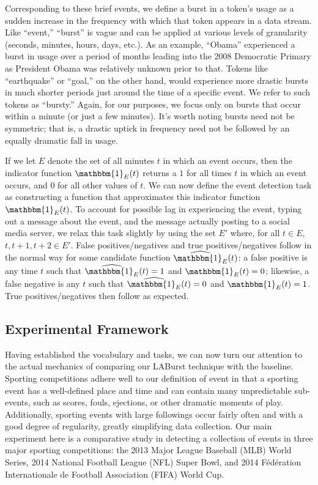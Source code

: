 \documentclass{sig-alternate}
\begin{document}
Corresponding to these brief events, we define a burst in a token's usage as a sudden increase in the frequency with which that token appears in a data stream.
Like ``event,'' ``burst'' is vague and can be applied at various levels of granularity (seconds, minutes, hours, days, etc.).
As an example, ``Obama'' experienced a burst in usage over a period of months leading into the 2008 Democratic Primary as President Obama was relatively unknown prior to that. 
Tokens like ``earthquake'' or ``goal,'' on the other hand, would experience more drastic bursts in much shorter periods just around the time of a specific event.
We refer to such tokens as ``bursty.''
Again, for our purposes, we focus only on bursts that occur within a minute (or just a few minutes). 
It's worth noting bursts need not be symmetric; that is, a drastic uptick in frequency need not be followed by an equally dramatic fall in usage.

If we let $E$ denote the set of all minutes $t$ in which an event occurs, then the indicator function $\mathbbm{1}_E(t)$ returns a $1$ for all times $t$ in which an event occurs, and $0$ for all other values of $t$. 
We can now define the event detection task as constructing a function that approximates this indicator function $\mathbbm{1}_E(t)$.
To account for possible lag in experiencing the event, typing out a message about the event, and the message actually posting to a social media server, we relax this task slightly by using the set $E'$ where, for all $t \in E$, $t, t+1, t+2 \in E'$.
False positives/negatives and true positives/negatives follow in the normal way for some candidate function $\widehat{\mathbbm{1}_E}(t)$: a false positive is any time $t$ such that $\widehat{\mathbbm{1}_E}(t) = 1$ and ${\mathbbm{1}_E}(t) = 0$; likewise, a false negative is any $t$ such that $\widehat{\mathbbm{1}_E}(t) = 0$ and ${\mathbbm{1}_E}(t) = 1$.
True positives/negatives then follow as expected.

\subsection{Experimental Framework}

Having established the vocabulary and tasks, we can now turn our attention to the actual mechanics of comparing our LABurst technique with the baseline.
Sporting competitions adhere well to our definition of event in that a sporting event has a well-defined place and time and can contain many unpredictable sub-events, such as scores, fouls, ejections, or other dramatic moments of play.
Additionally, sporting events with large followings occur fairly often and with a good degree of regularity, greatly simplifying data collection.
Our main experiment here is a comparative study in detecting a collection of events in three major sporting competitions: the 2013 Major League Baseball (MLB) World Series, 2014 National Football League (NFL) Super Bowl, and 2014 F\'{e}d\'{e}ration Internationale de Football Association (FIFA) World Cup.
\end{document}
